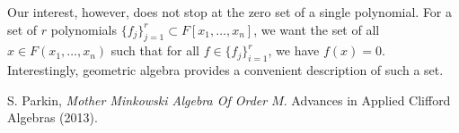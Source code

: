 \documentclass{birkjour}
\theoremstyle{definition}
\theoremstyle{remark}
\numberwithin{equation}{section}
\begin{document}
Our interest, however, does not stop at the zero set of a single polynomial.  For a set of
$r$ polynomials $\{f_j\}_{j=1}^r\subset F[x_1,\dots,x_n]$, we want the set of all
$x\in F(x_1,\dots,x_n)$ such that for all $f\in\{f_j\}_{i=1}^r$, we have $f(x)=0$.
Interestingly, geometric algebra provides a convenient description of such a set.



\begin{thebibliography}{9}

S. Parkin, {\it Mother Minkowski Algebra Of Order $M$}.
Advances in Applied Clifford Algebras (2013).

\end{thebibliography}
\end{document}
